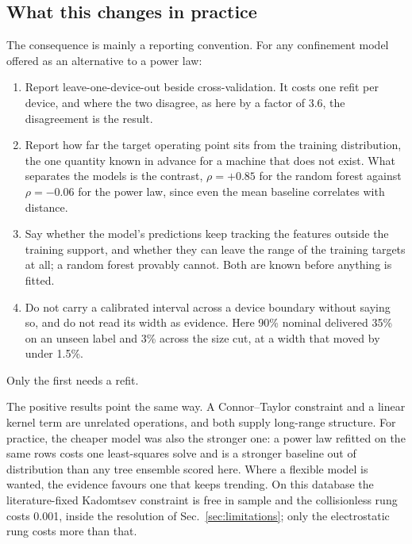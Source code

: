 \documentclass[aip,pop,preprint,amsmath,amssymb]{revtex4-2}
\begin{document}
\subsection{What this changes in practice}
\label{sec:checklist}

The consequence is mainly a reporting convention. For any confinement model
offered as an alternative to a power law:
\begin{enumerate}\setlength{\itemsep}{3pt}
\item Report leave-one-device-out beside cross-validation. It costs one refit per
device, and where the two disagree, as here by a factor of 3.6, the
disagreement is the result.
\item Report how far the target operating point sits from the training
distribution, the one quantity known in advance for a machine that does not
exist. What separates the models is the contrast, $\rho=+0.85$ for the random
forest against $\rho=-0.06$ for the power law, since even the mean baseline
correlates with distance.
\item Say whether the model's predictions keep tracking the features outside
the training support, and whether they can leave the range of the training
targets at all; a random forest provably cannot. Both are known before
anything is fitted.
\item Do not carry a calibrated interval across a device boundary without saying
so, and do not read its width as evidence. Here 90\% nominal delivered 35\% on
an unseen label and 3\% across the size cut, at a width that moved by under
1.5\%.
\end{enumerate}
\noindent Only the first needs a refit.

The positive results point the same way. A Connor--Taylor constraint and a
linear kernel term are unrelated operations, and both supply long-range
structure. For practice, the cheaper model was also the stronger one: a power
law refitted on the same rows costs one least-squares solve and is a stronger
baseline out of distribution than any tree ensemble scored here. Where a flexible model is wanted, the
evidence favours one that keeps trending. On this database the
literature-fixed Kadomtsev constraint is free in sample and the collisionless rung costs 0.001,
inside the resolution of Sec.~\ref{sec:limitations}; only the electrostatic
rung costs more than that.
\end{document}
